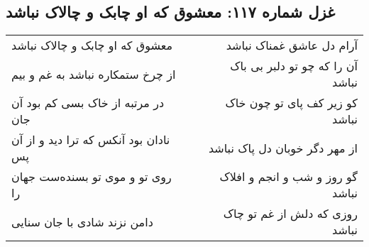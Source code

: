 \begin{center}
\section*{غزل شماره ۱۱۷: معشوق که او چابک و چالاک نباشد}
\label{sec:117}
\begin{longtable}{l p{0.5cm} r}
معشوق که او چابک و چالاک نباشد
&&
آرام دل عاشق غمناک نباشد
\\
از چرخ ستمکاره نباشد به غم و بیم
&&
آن را که چو تو دلبر بی باک نباشد
\\
در مرتبه از خاک بسی کم بود آن جان
&&
کو زیر کف پای تو چون خاک نباشد
\\
نادان بود آنکس که ترا دید و از آن پس
&&
از مهر دگر خوبان دل پاک نباشد
\\
روی تو و موی تو بسنده‌ست جهان را
&&
گو روز و شب و انجم و افلاک نباشد
\\
دامن نزند شادی با جان سنایی
&&
روزی که دلش از غم تو چاک نباشد
\\
\end{longtable}
\end{center}
